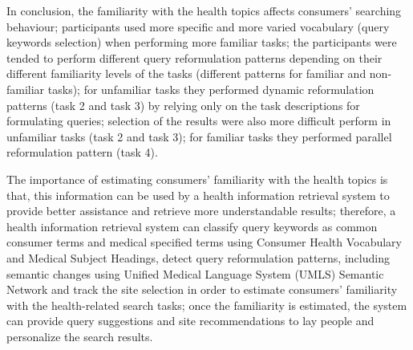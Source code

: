 \documentclass[]{article}
\begin{document}
In conclusion, the familiarity with the health topics affects consumers' searching behaviour; participants used more specific and more varied vocabulary (query keywords selection) when performing more familiar tasks; the participants were tended to perform different query reformulation patterns depending on their different familiarity levels of the tasks (different patterns for familiar and non-familiar tasks); for unfamiliar tasks they performed dynamic reformulation patterns (task 2 and task 3) by relying only on the task descriptions for formulating queries; selection of the results were also more difficult perform in unfamiliar tasks (task 2 and task 3); for familiar tasks they performed parallel reformulation pattern (task 4).     


The importance of estimating consumers' familiarity with the health topics is that, this information can be used by a health information retrieval system to provide better assistance and retrieve more understandable results; therefore, a health information retrieval system can classify query keywords as common consumer terms and medical specified terms using Consumer Health Vocabulary and Medical Subject Headings, detect query reformulation patterns, including semantic changes using Unified Medical Language System (UMLS) Semantic Network and track the site selection in order to estimate consumers' familiarity with the health-related search tasks; once the familiarity is estimated, the system can provide query suggestions and site recommendations to lay people and personalize the search results.        
\end{document}
